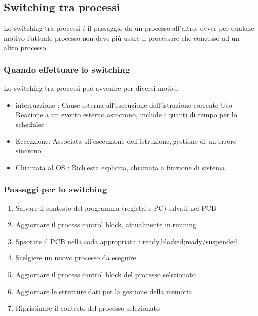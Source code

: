 \subsection{Switching tra processi}
Lo switching tra processi é il passaggio da un processo all'altro, ovver per qualche motivo l'attuale processo non deve piú usare
il processore che concesso ad un altro processo.
\subsubsection{Quando effettuare lo switching}
Lo switching tra processi puó avvenire per diversi motivi:
\begin{itemize}
    \item interruzzione : Cause esterna all'esecuzione dell'istruzione corrente Uso Reazione a un evento esterno asincrono, include i quanti di tempo per lo scheduler
    \item Eccezzione: Associata all'esecuzione dell'istruzione, gestione di un errore sincrono
    \item Chiamata al OS : Richiesta esplicita, chiamata a funzione di sistema
\end{itemize}
\subsubsection{Passaggi per lo switching}
\begin{enumerate}
    \item Salvare il contesto del programma (registri e PC) salvati nel PCB
    \item Aggiornare il process control block, attualmente in running
    \item Spsotare il PCB nella coda appropriata : ready,blocked;ready/suspended
    \item Scelgiere un nuovo processo da eseguire
    \item Aggiornare il process control block del processo selezionato
    \item Aggiornare le strutture dati per la gestione della memoria
    \item Ripristinare il contesto del processo selezionato
\end{enumerate}
